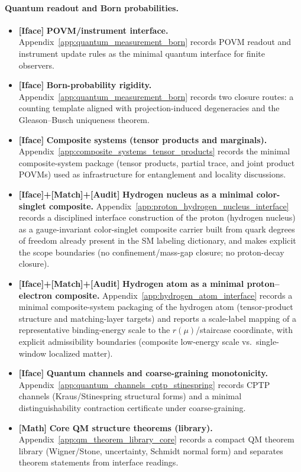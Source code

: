 \paragraph{Quantum readout and Born probabilities.}
\begin{itemize}
\item \textbf{[Iface]} \textbf{POVM/instrument interface.}
Appendix~\ref{app:quantum_measurement_born} records POVM readout and instrument update rules as the minimal quantum interface for finite observers.
\item \textbf{[Iface]} \textbf{Born-probability rigidity.}
Appendix~\ref{app:quantum_measurement_born} records two closure routes: a counting template aligned with projection-induced degeneracies and the Gleason--Busch uniqueness theorem.
\item \textbf{[Iface]} \textbf{Composite systems (tensor products and marginals).}
Appendix~\ref{app:composite_systems_tensor_products} records the minimal composite-system package (tensor products, partial trace, and joint product POVMs) used as infrastructure for entanglement and locality discussions.
\item \textbf{[Iface]+[Match]+[Audit]} \textbf{Hydrogen nucleus as a minimal color-singlet composite.}
Appendix~\ref{app:proton_hydrogen_nucleus_interface} records a disciplined interface construction of the proton (hydrogen nucleus) as a gauge-invariant color-singlet composite carrier built from quark degrees of freedom already present in the SM labeling dictionary, and makes explicit the scope boundaries (no confinement/mass-gap closure; no proton-decay closure).
\item \textbf{[Iface]+[Match]+[Audit]} \textbf{Hydrogen atom as a minimal proton--electron composite.}
Appendix~\ref{app:hydrogen_atom_interface} records a minimal composite-system packaging of the hydrogen atom (tensor-product structure and matching-layer targets) and reports a scale-label mapping of a representative binding-energy scale to the $r(\mu)$/staircase coordinate, with explicit admissibility boundaries (composite low-energy scale vs.\ single-window localized matter).
\item \textbf{[Iface]} \textbf{Quantum channels and coarse-graining monotonicity.}
Appendix~\ref{app:quantum_channels_cptp_stinespring} records CPTP channels (Kraus/Stinespring structural forms) and a minimal distinguishability contraction certificate under coarse-graining.
\item \textbf{[Math]} \textbf{Core QM structure theorems (library).}
Appendix~\ref{app:qm_theorem_library_core} records a compact QM theorem library (Wigner/Stone, uncertainty, Schmidt normal form) and separates theorem statements from interface readings.
\end{itemize}

